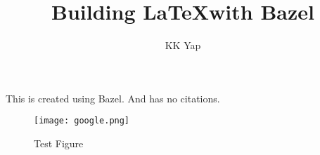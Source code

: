 \documentclass{article}
\begin{document}
\title{Building \LaTeX with Bazel}
\author{KK Yap}
\maketitle

This is created using Bazel.  And has no citations.

\begin{figure}[htb]
\texttt{[image: google.png]}
\caption{Test Figure}
\end{figure}
\end{document}
